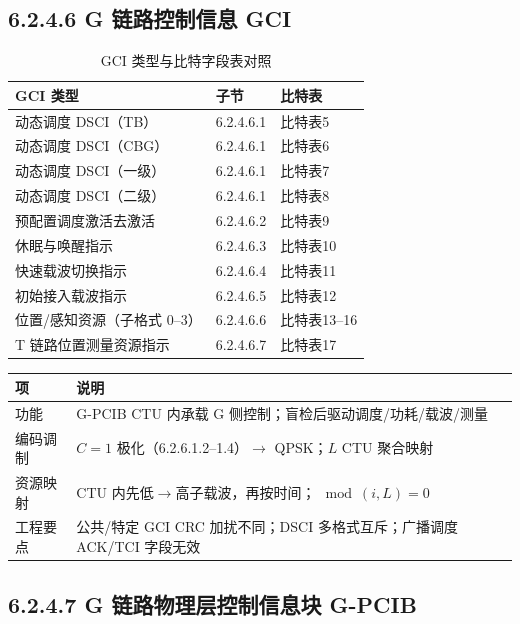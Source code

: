 \documentclass[11pt,a4paper]{ctexart}
\begin{document}
\subsection{6.2.4.6 G 链路控制信息 GCI}

\begin{table}[h]
\centering
\small
\caption{GCI 类型与比特字段表对照}
\begin{tabular}{L{4.8cm}L{2cm}L{4.2cm}}
\toprule
\textbf{GCI 类型} & \textbf{子节} & \textbf{比特表} \\
\midrule
动态调度 DSCI（TB） & 6.2.4.6.1 & 比特表5 \\
动态调度 DSCI（CBG） & 6.2.4.6.1 & 比特表6 \\
动态调度 DSCI（一级） & 6.2.4.6.1 & 比特表7 \\
动态调度 DSCI（二级） & 6.2.4.6.1 & 比特表8 \\
预配置调度激活去激活 & 6.2.4.6.2 & 比特表9 \\
休眠与唤醒指示 & 6.2.4.6.3 & 比特表10 \\
快速载波切换指示 & 6.2.4.6.4 & 比特表11 \\
初始接入载波指示 & 6.2.4.6.5 & 比特表12 \\
位置/感知资源（子格式 0--3） & 6.2.4.6.6 & 比特表13--16 \\
T 链路位置测量资源指示 & 6.2.4.6.7 & 比特表17 \\
\bottomrule
\end{tabular}
\end{table}

\begin{table}[h]
\centering
\small
\begin{tabular}{L{2.2cm}L{10.8cm}}
\toprule
\textbf{项} & \textbf{说明} \\
\midrule
功能 & G-PCIB CTU 内承载 G 侧控制；盲检后驱动调度/功耗/载波/测量 \\
编码调制 & $C{=}1$ 极化（6.2.6.1.2--1.4）$\rightarrow$ QPSK；$L$ CTU 聚合映射 \\
资源映射 & CTU 内先低$\rightarrow$高子载波，再按时间；$\mod(i,L){=}0$ \\
工程要点 & 公共/特定 GCI CRC 加扰不同；DSCI 多格式互斥；广播调度 ACK/TCI 字段无效 \\
\bottomrule
\end{tabular}
\end{table}

\subsection{6.2.4.7 G 链路物理层控制信息块 G-PCIB}
\end{document}
